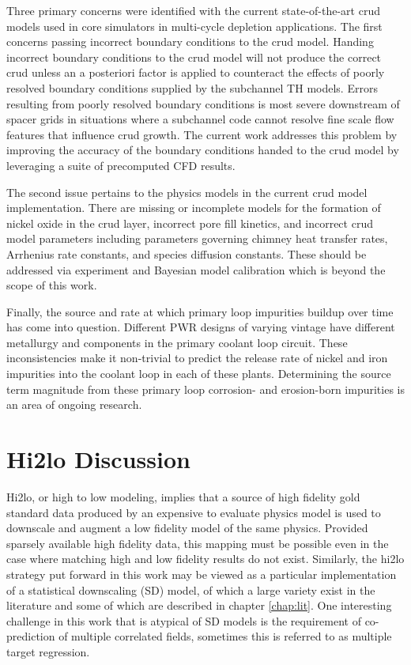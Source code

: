 Three primary concerns were identified with the current state-of-the-art crud models used in core simulators in multi-cycle depletion applications.
The first concerns passing incorrect boundary conditions to the crud model.  Handing incorrect boundary conditions to the crud model will not produce the correct crud unless an a posteriori factor is applied to counteract the effects of poorly resolved boundary conditions supplied by the subchannel TH models.  Errors resulting from poorly resolved boundary conditions is most severe downstream of spacer grids in situations where a subchannel code cannot resolve fine scale flow features that influence crud growth.  The current work addresses this problem by improving the accuracy of the boundary conditions handed to the crud model by leveraging a suite of precomputed CFD results.

The second issue pertains to the physics models in the current crud model implementation.  There are missing or incomplete models for the formation of nickel oxide in the crud layer, incorrect pore fill kinetics, and incorrect crud model parameters including parameters governing chimney heat transfer rates, Arrhenius rate constants, and species diffusion constants. These should be addressed via experiment and Bayesian model calibration which is beyond the scope of this work.

Finally, the source and rate at which primary loop impurities buildup over time has come into question.  Different PWR designs of varying vintage have different metallurgy and components in the primary coolant loop circuit.  These inconsistencies make it non-trivial to predict the release rate of nickel and iron impurities into the coolant loop in each of these plants.  Determining the source term magnitude from these primary loop corrosion- and erosion-born impurities is an area of ongoing research.



\section{Hi2lo Discussion}

Hi2lo, or high to low modeling, implies that a source of high fidelity gold standard data produced by an expensive to evaluate physics model is used to downscale and augment a low fidelity model of the same physics.
Provided sparsely available high fidelity data, this mapping must be possible even in the case where matching high and low fidelity results do not exist.  Similarly, the hi2lo strategy put forward in this work may be viewed as a particular implementation of a statistical downscaling (SD) model, of which a large variety exist in the literature and some of which are described in chapter \ref{chap:lit}.  One interesting challenge in this work that is atypical of SD models is the requirement of co-prediction of multiple correlated fields, sometimes this is referred to as multiple target regression.

